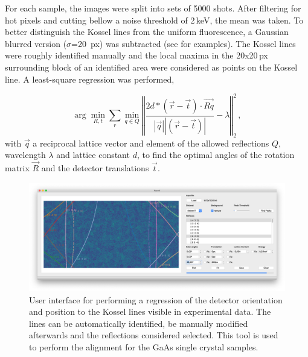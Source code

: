 For each sample, the images were split into sets of 5000 shots. After filtering for hot pixels and cutting bellow a noise threshold of 2\,keV, the mean was taken. To better distinguish the Kossel lines from the uniform fluorescence, a Gaussian blurred version ($\sigma$=20\, px) was subtracted (see  for examples). The Kossel lines were roughly identified manually and the local maxima in the 20x20\,px surrounding block of an identified area were considered as points on the Kossel line. A least-square regression was performed,

\begin{equation}
	\arg\!\min_{R,t} \sum_{r} \min_{q\in Q} \left\Vert \frac{2 d * \left( \vec{r} - \vec{t} \right) \cdot \vec{Rq}}{\left|\vec{q}\right| \left| \left(\vec{r}-\vec{t}\right)\right|} -\lambda \right\Vert_2^2 \,,
\end{equation}
with
$\vec{q}$ a reciprocal lattice vector and element of the allowed reflections $Q$, wavelength $\lambda$ and lattice constant $d$, to find
 the optimal angles of the rotation matrix $\vec{R}$ and the detector translations $\vec{t}$.
 


\begin{figure}
	\centering
	\includegraphics[width=0.8\linewidth]{images/kosselfit.png}
	\caption[User Interface for Kossel line based alignment]{User interface for performing a regression of the detector orientation and position to the Kossel lines visible in experimental data. The lines can be automatically identified,  be  manually modified afterwards and the reflections considered selected. This tool is used to perform the alignment for the GaAs single crystal samples.}
	\label{fig:kosselfit}
\end{figure}





